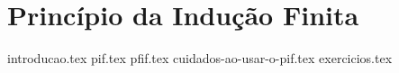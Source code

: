\chapter{Princípio da Indução Finita}
{
    \newcommand{\chapterdir}{../capitulos/principio-da-inducao-finita/}

    {introducao.tex}
    {pif.tex}
    {pfif.tex}
    {cuidados-ao-usar-o-pif.tex}
    {exercicios.tex}
}